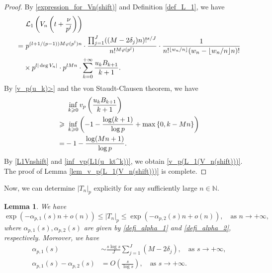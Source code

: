 \documentclass[12pt]{article}
\newtheorem{lemma}[theorem]{Lemma}
\numberwithin{equation}{section}
\begin{document}
\begin{proof}
By \eqref{expression_for_Vn(shift)} and Definition \ref{def_L_1}, we have
\begin{align}
&~ \mathcal{L}_1\left( V_n\left(t+\frac{\nu}{p^l}\right) \right) \notag\\
= &~ p^{(l+1/(p-1))M\varphi(p^{l})n} \cdot \frac{\prod_{j=1}^{J} ((M-2\delta_j)n)!^{s/J}}{n!^{M\varphi(p^{l})}} \cdot \frac{1}{n!^{\lfloor w_n / n\rfloor}(w_n-\lfloor w_n / n\rfloor n)!} \notag \\
&\times p^{l|\deg V_n|} \cdot p^{lMn} \cdot \sum_{k=0}^{+\infty} \frac{u_kB_{k+1}}{k+1}. \label{L1Vnshift}
\end{align}
By \eqref{v_p(u_k)>} and the von Staudt-Clausen theorem, we have
\begin{align}
	 &~\inf_{k \geqslant 0} v_p\left( \frac{u_kB_{k+1}}{k+1} \right)  \notag\\
	\geqslant&~ \inf_{k \geqslant 0} \left( -1-\frac{\log(k+1)}{\log p} + \max\left\{ 0, k -Mn \right\} \right)  \notag\\
	=& -1-\frac{\log(Mn+1)}{\log p}. \label{inf_vp(L1(u_kt^k))}
\end{align}
By \eqref{L1Vnshift} and \eqref{inf_vp(L1(u_kt^k))}, we obtain \eqref{v_p(L_1(V_n(shift)))}. The proof of Lemma \ref{lem_v_p(L_1(V_n(shift)))} is complete.
\end{proof}

\bigskip

Now, we can determine $|T_n|_p$ explicitly for any sufficiently large $n \in \mathbb{N}$.
\begin{lemma}\label{lem_p_ana_Tn}
We have
\begin{equation}\label{p_adic_norm_Tn}
	\exp\left( -\alpha_{p,1}(s)n + o(n) \right) \leqslant \left| T_n \right|_p \leqslant \exp\left( -\alpha_{p,2}(s)n + o(n) \right), \quad\text{as~} n \to +\infty,
\end{equation} 
where $\alpha_{p,1}(s),\alpha_{p,2}(s)$ are given by \eqref{defi_alpha_1} and \eqref{defi_alpha_2}, respectively. Moreover, we have
\begin{align}
	\alpha_{p,1}(s) &\sim  \frac{s\log s}{J} \sum_{j=1}^{J}(M-2\delta_j), \quad\text{as~} s \to  +\infty, \label{est_alpha_1}\\
	\alpha_{p,1}(s) - \alpha_{p,2}(s) &= O\left(\frac{s}{\log s}\right), \quad\text{as~} s \to  +\infty. \label{est_alpha_2}
\end{align}
\end{lemma}
\end{document}
